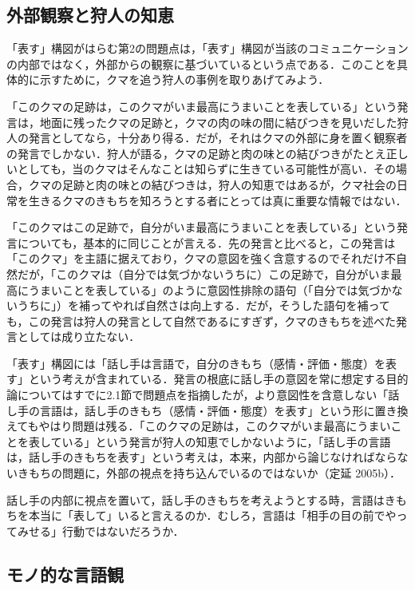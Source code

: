 \documentclass[japanese]{jnlp_1.3b}
\begin{document}
\subsection{外部観察と狩人の知恵}

「表す」構図がはらむ第2の問題点は，「表す」構図が当該のコミュニケーションの内部ではなく，外部からの観察に基づいているという点である．このことを具体的に示すために，クマを追う狩人の事例を取りあげてみよう．

「このクマの足跡は，このクマがいま最高にうまいことを表している」という発言は，地面に残ったクマの足跡と，クマの肉の味の間に結びつきを見いだした狩人の発言としてなら，十分あり得る．だが，それはクマの外部に身を置く観察者の発言でしかない．狩人が語る，クマの足跡と肉の味との結びつきがたとえ正しいとしても，当のクマはそんなことは知らずに生きている可能性が高い．その場合，クマの足跡と肉の味との結びつきは，狩人の知恵ではあるが，クマ社会の日常を生きるクマのきもちを知ろうとする者にとっては真に重要な情報ではない．

「このクマはこの足跡で，自分がいま最高にうまいことを表している」という発言についても，基本的に同じことが言える．先の発言と比べると，この発言は「このクマ」を主語に据えており，クマの意図を強く含意するのでそれだけ不自然だが，「このクマは（自分では気づかないうちに）この足跡で，自分がいま最高にうまいことを表している」のように意図性排除の語句（「自分では気づかないうちに」）を補ってやれば自然さは向上する．だが，そうした語句を補っても，この発言は狩人の発言として自然であるにすぎず，クマのきもちを述べた発言としては成り立たない．

「表す」構図には「話し手は言語で，自分のきもち（感情・評価・態度）を表す」という考えが含まれている．発言の根底に話し手の意図を常に想定する目的論についてはすでに2.1節で問題点を指摘したが，より意図性を含意しない「話し手の言語は，話し手のきもち（感情・評価・態度）を表す」という形に置き換えてもやはり問題は残る．「このクマの足跡は，このクマがいま最高にうまいことを表している」という発言が狩人の知恵でしかないように，「話し手の言語は，話し手のきもちを表す」という考えは，本来，内部から論じなければならないきもちの問題に，外部の視点を持ち込んでいるのではないか（定延 2005b）．

話し手の内部に視点を置いて，話し手のきもちを考えようとする時，言語はきもちを本当に「表して」いると言えるのか．むしろ，言語は「相手の目の前でやってみせる」行動ではないだろうか．


\subsection{モノ的な言語観}
\end{document}
